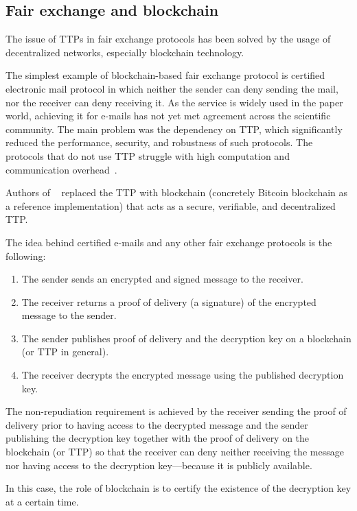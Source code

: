 \subsection{Fair exchange and blockchain}

The issue of TTPs in fair exchange protocols has been solved by the usage of decentralized networks, especially blockchain technology.

The simplest example of blockchain-based fair exchange protocol is certified electronic mail protocol in which neither the sender can deny sending the mail, nor the receiver can deny receiving it. As the service is widely used in the paper world, achieving it for e-mails has not yet met agreement across the scientific community. The main problem was the dependency on TTP, which significantly reduced the performance, security, and robustness of such protocols. The protocols that do not use TTP struggle with high computation and communication overhead~\cite{hinarejosSolutionSecureCertified2019}.

Authors of ~\cite{hinarejosSolutionSecureCertified2019} replaced the TTP with blockchain (concretely Bitcoin blockchain as a reference implementation) that acts as a secure, verifiable, and decentralized TTP.

The idea behind certified e-mails and any other fair exchange protocols is the following:
\begin{enumerate}
    \item The sender sends an encrypted and signed message to the receiver.
    \item The receiver returns a proof of delivery (a signature) of the encrypted message to the sender.
    \item The sender publishes proof of delivery and the decryption key on a blockchain (or TTP in general).
    \item The receiver decrypts the encrypted message using the published decryption key.
\end{enumerate}

The non-repudiation requirement is achieved by the receiver sending the proof of delivery prior to having access to the decrypted message and the sender publishing the decryption key together with the proof of delivery on the blockchain (or TTP) so that the receiver can deny neither receiving the message nor having access to the decryption key—because it is publicly available.

In this case, the role of blockchain is to certify the existence of the decryption key at a certain time.

